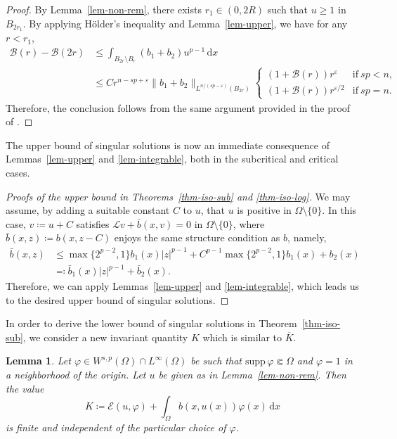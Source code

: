 \documentclass[11pt]{amsart}
\theoremstyle{plain}
\newtheorem{lemma}[theorem]{Lemma}
\theoremstyle{definition}
\numberwithin{equation}{section}
\begin{document}
\begin{proof}
By Lemma~\ref{lem-non-rem}, there exists $r_1 \in (0, 2R)$ such that $u \geq 1$ in $B_{2r_1}$. By applying H\"older's inequality and Lemma~\ref{lem-upper}, we have for any $r < r_1$,
    \begin{equation*}
    \begin{split}
        \mathcal{B}(r)-\mathcal{B}(2r)
        &\leq \int_{B_{2r} \setminus B_r} (b_1+b_2)u^{p-1} \,\mathrm{d}x\\
        &\leq Cr^{n-sp+\varepsilon}\|b_1+b_2\|_{L^{n/(sp-\varepsilon)}(B_{2r})} \begin{cases}
(1+\mathcal{B}(r))r^{\varepsilon} &\text{if}~sp<n, \\
(1+\mathcal{B}(r))r^{\varepsilon/2} &\text{if}~sp=n.
\end{cases}
    \end{split}
    \end{equation*}
Therefore, the conclusion follows from the same argument provided in the proof of \cite[Lemma~2]{Ser65}.
\end{proof}




The upper bound of singular solutions is now an immediate consequence of Lemmas~\ref{lem-upper} and \ref{lem-integrable}, both in the subcritical and critical cases.
\begin{proof}[Proofs of the upper bound in Theorems~\ref{thm-iso-sub} and \ref{thm-iso-log}]
We may assume, by adding a suitable constant $C$ to $u$, that $u$ is positive in $\Omega \setminus \{0\}$. In this case, $v\coloneqq u+C$ satisfies $\mathcal{L}v+\bar{b}(x, v)=0$ in $\Omega \setminus \{0\}$, where $\bar{b}(x, z) \coloneqq b(x, z-C)$ enjoys the same structure condition as $b$, namely,
\begin{align*}
    \bar{b}(x, z)
    &\leq \max\{2^{p-2}, 1\}b_1(x) |z|^{p-1} + C^{p-1}\max\{2^{p-2}, 1\}b_1(x)+b_2(x) \\
    &\eqqcolon \bar{b}_1(x)|z|^{p-1} + \bar{b}_2(x).
\end{align*}
Therefore, we can apply Lemmas~\ref{lem-upper} and \ref{lem-integrable}, which leads us to the desired upper bound of singular solutions.
\end{proof}

In order to derive the lower bound of singular solutions in Theorem~\ref{thm-iso-sub}, we consider a new invariant quantity $K$ which is similar to $\overline{K}$.

\begin{lemma}\label{lem-K}
Let $\varphi \in W^{s, p}(\Omega) \cap L^\infty(\Omega)$ be such that $\mathrm{supp}\,{\varphi} \Subset \Omega$ and $\varphi= 1$ in a neighborhood of the origin. Let $u$ be given as in Lemma~\ref{lem-non-rem}. Then the value
\begin{equation}\label{eq-const-K}
K\coloneqq \mathcal{E}(u, \varphi)+\int_{\Omega} b(x, u(x))\varphi(x) \,\mathrm{d}x
\end{equation}
is finite and independent of the particular choice of $\varphi$.
\end{lemma}
\end{document}
